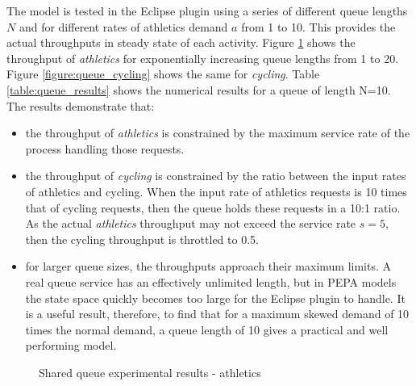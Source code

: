 \FloatBarrier
The model is tested in the Eclipse plugin using a series of different queue lengths $\mathit{N}$ and for different rates of athletics demand $\mathit{a}$ from 1 to 10.  This provides the actual throughputs in steady state of each activity.  Figure \ref{figure:queue_athletics} shows the throughput of {\itshape athletics} for exponentially increasing queue lengths from 1 to 20.  Figure \ref{figure:queue_cycling} shows the same for {\itshape cycling}.  Table \ref{table:queue_results} shows the numerical results for a queue of length N=10.
The results demonstrate that:
\begin{itemize}
	\item the throughput of {\itshape athletics} is constrained by the maximum service rate of the process handling those requests.
	\item the throughput of {\itshape cycling} is constrained by the ratio between the input rates of athletics and cycling.  When the input rate of athletics requests is 10 times that of cycling requests, then the queue holds these requests in a 10:1 ratio.  As the actual {\itshape athletics} throughput may not exceed the service rate $\mathit{s=5}$, then the cycling throughput is throttled to 0.5.
	\item for larger queue sizes, the throughputs approach their maximum limits.  A real queue service has an effectively unlimited length, but in PEPA models the state space quickly becomes too large for the Eclipse plugin to handle.  It is a useful result, therefore, to find that for a maximum skewed demand of 10 times the normal demand, a queue length of 10 gives a practical and well performing model.
\end{itemize}

\begin{figure}
	\centering
	\caption{Shared queue experimental results - athletics}
	\label{figure:queue_athletics}
\end{figure}

